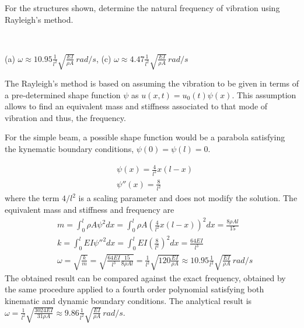 
\begin{Exercise}[label={rayleigh_sdof}]
For the structures shown, determine the natural frequency of vibration using Rayleigh's method.

\begin{center}
     \\
\end{center}

\shortAnswer (a) $\omega \approx 10.95\frac{1}{l^2}\sqrt{\frac{EI}{\rho A}}\,\si{rad/s}$, (c) $\omega \approx 4.47\frac{1}{l^2}\sqrt{\frac{EI}{\rho A}}\,\si{rad/s}$
\end{Exercise}


\begin{Answer}[ref={rayleigh_sdof}]
The Rayleigh's method is based on assuming the vibration to be given in terms of a pre-determined shape function $\psi$ as $u(x,t) = u_0(t)\psi(x)$. This assumption allows to find an equivalent mass and stiffness associated to that mode of vibration and thus, the frequency.

\parbox{.7\textwidth}{For the simple beam, a possible shape function would be a parabola satisfying the kynematic boundary conditions, $\psi(0) = \psi(l) = 0$.} \hspace{1em}
\parbox{.25\textwidth}{}
\begin{align*}
&\psi(x) = \frac{4}{l^2} x (l-x) \\
&\psi''(x) = \frac{8}{l^2}
\end{align*}
where the term $4/l^2$ is a scaling parameter and does not modify the solution. The equivalent mass and stiffness and frequency are
\begin{align*}
&m = \int_0^l \rho A\psi^2dx = \int_0^l \rho A \left(\frac{4}{l^2} x (l-x)\right)^2dx = \frac{8\rho Al}{15} \\
&k = \int_0^l EI \psi''^2 dx = \int_0^l EI \left(\frac{8}{l^2}\right)^2dx = \frac{64EI}{l^3} \\
&\omega = \sqrt{\frac{k}{m}} = \sqrt{\frac{64EI}{l^3}\frac{15}{8\rho Al}} = \frac{1}{l^2}\sqrt{120\frac{EI}{\rho A}} \approx 10.95\frac{1}{l^2}\sqrt{\frac{EI}{\rho A}}\,\si{rad/s}
\end{align*}
The obtained result can be compared against the exact frequency, obtained by the same procedure applied to a fourth order polynomial satisfying both kinematic and dynamic boundary conditions. The analytical result is $\omega = \frac{1}{l^2}\sqrt{\frac{3024EI}{31\rho A}} \approx 9.86\frac{1}{l^2}\sqrt{\frac{EI}{\rho A}}\,{rad/s}$.


\end{Answer}
